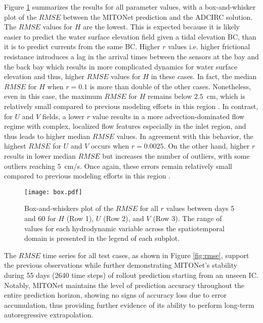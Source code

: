 \documentclass[draft]{agujournal2019}
\begin{document}
Figure \ref{fig:box} summarizes the results for all parameter values, with a box-and-whisker plot of the $RMSE$ between the MITONet prediction and the ADCIRC solution. The $RMSE$ values for $H$ are the lowest. This is expected because it is likely easier to predict the water surface elevation field given a tidal elevation BC, than it is to predict currents from the same BC. Higher $r$ values i.e. higher frictional resistance introduces a lag in the arrival times between the sensors at the bay and the back bay which results in more complicated dynamics for water surface elevation and thus, higher $RMSE$ values for $H$ in these cases. In fact, the median $RMSE$ for $H$ when $r=0.1$ is more than double of the other cases. Nonetheless, even in this case, the maximum $RMSE$ for $H$ remains below $2.5$~cm, which is relatively small compared to previous modeling efforts in this region \cite{militello2001shinnecock, lin2022numerical}. In contrast, for $U$ and $V$ fields, a lower $r$ value results in a more advection-dominated flow regime with complex, localized flow features especially in the inlet region, and thus leads to higher median $RMSE$ values. In agreement with this behavior, the highest $RMSE$ for $U$ and $V$ occurs when $r=0.0025$. On the other hand, higher $r$ results in lower median $RMSE$ but increases the number of outliers, with some outliers reaching $5$~cm/s. Once again, these errors remain relatively small compared to previous modeling efforts in this region \cite{militello2001shinnecock}.

\begin{figure}[h]
    \centering
    \texttt{[image: box.pdf]}
    \caption{Box-and-whiskers plot of the $RMSE$ for all $r$ values between days 5 and 60 for $H$ (Row 1), $U$ (Row 2), and $V$ (Row 3). The range of values for each hydrodynamic variable across the spatiotemporal domain is presented in the legend of each subplot.}
    \label{fig:box}
\end{figure}

The $RMSE$ time series for all test cases, as shown in Figure \ref{fig:rmse}, support the previous observations while further demonstrating MITONet's stability during 55 days (2640 time steps) of rollout prediction starting from an unseen IC. Notably, MITONet maintains the level of prediction accuracy throughout the entire prediction horizon, showing no signs of accuracy loss due to error accumulation, thus providing further evidence of its ability to perform long-term autoregressive extrapolation.
\end{document}
